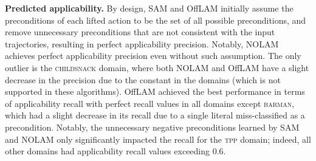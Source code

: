 \documentclass{article}
\newcommand{\miniparagraph}[1]{\textbf{#1.}}
\theoremstyle{definition}
\theoremstyle{remark}
\newcommand{\sam}{\ac{SAM}\xspace}
\newcommand{\nolam}{NOLAM\xspace}
\newcommand{\offlam}{OffLAM\xspace}
\newcommand{\samshort}{SAM}
\newif\ifaddcomments
\newcommand{\roni}[1]{\ifaddcomments{\textcolor{red}{[Roni: #1]}}\fi}
\newcommand{\leo}[1]{\ifaddcomments{\textcolor{pink}{[Leonardo: #1]}}\fi}
\begin{document}



\miniparagraph{Predicted applicability} 
By design, \samshort{} and \offlam{} initially assume the preconditions of each lifted action to be the set of all possible preconditions, and remove unnecessary preconditions that are not consistent with the input trajectories, resulting in perfect applicability precision. Notably, \nolam{} achieves perfect applicability precision even without such assumption.
The only outlier is the \textsc{childsnack} domain, where both \nolam{} and \offlam{} have a slight decrease in the precision due to the constant in the domains (which is not supported in these algorithms).
\offlam{} achieved the best performance in terms of applicability recall with perfect recall values in all domains except \textsc{barman}, which had a slight decrease in its recall due to a single literal miss-classified as a precondition. 
Notably, the unnecessary negative preconditions learned by \samshort{} and \nolam{} only significantly impacted the recall for the \textsc{tpp} domain; indeed, all other domains had applicability recall values exceeding $0.6$. 
\end{document}

